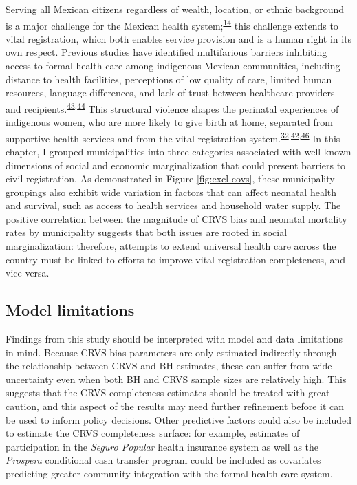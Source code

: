 \documentclass[
]{article}
\begin{document}
Serving all Mexican citizens regardless of wealth, location, or ethnic background is a major challenge for the Mexican health system;\textsuperscript{\protect\hyperlink{ref-Frenk2006}{14}} this challenge extends to vital registration, which both enables service provision and is a human right in its own respect. Previous studies have identified multifarious barriers inhibiting access to formal health care among indigenous Mexican communities, including distance to health facilities, perceptions of low quality of care, limited human resources, language differences, and lack of trust between healthcare providers and recipients.\textsuperscript{\protect\hyperlink{ref-Paulino2019}{43},\protect\hyperlink{ref-Gamlin2020}{44}} This structural violence shapes the perinatal experiences of indigenous women, who are more likely to give birth at home, separated from supportive health services and from the vital registration system.\textsuperscript{\protect\hyperlink{ref-Hernandez2012}{32},\protect\hyperlink{ref-Enciso2017}{42},\protect\hyperlink{ref-Luis2014}{46}} In this chapter, I grouped municipalities into three categories associated with well-known dimensions of social and economic marginalization that could present barriers to civil registration. As demonstrated in Figure \ref{fig:excl-covs}, these municipality groupings also exhibit wide variation in factors that can affect neonatal health and survival, such as access to health services and household water supply. The positive correlation between the magnitude of CRVS bias and neonatal mortality rates by municipality suggests that both issues are rooted in social marginalization: therefore, attempts to extend universal health care across the country must be linked to efforts to improve vital registration completeness, and vice versa.

\hypertarget{model-limitations}{%
\subsection{Model limitations}\label{model-limitations}}

Findings from this study should be interpreted with model and data limitations in mind. Because CRVS bias parameters are only estimated indirectly through the relationship between CRVS and BH estimates, these can suffer from wide uncertainty even when both BH and CRVS sample sizes are relatively high. This suggests that the CRVS completeness estimates should be treated with great caution, and this aspect of the results may need further refinement before it can be used to inform policy decisions. Other predictive factors could also be included to estimate the CRVS completeness surface: for example, estimates of participation in the \emph{Seguro Popular} health insurance system as well as the \emph{Prospera} conditional cash transfer program could be included as covariates predicting greater community integration with the formal health care system.
\end{document}
